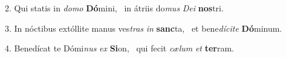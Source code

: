 2. Qui statis in \textit{do}\textit{mo} \textbf{Dó}mini, \ast\  in átriis do\textit{mus} \textit{De}\textit{i} \textbf{nos}tri.\

3. In nóctibus extóllite manus ves\textit{tras} \textit{in} \textbf{sanc}ta, \ast\  et bene\textit{dí}\textit{ci}\textit{te} \textbf{Dó}minum.\

4. Benedícat te Dómi\textit{nus} \textit{ex} \textbf{Si}on, \ast\  qui fecit \textit{cæ}\textit{lum} \textit{et} \textbf{ter}ram.\

